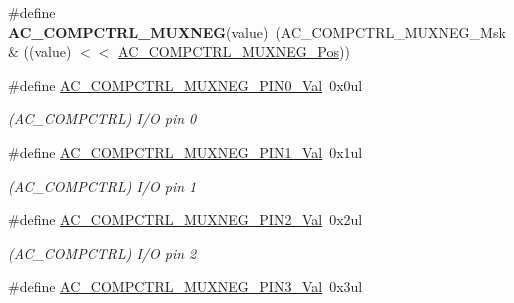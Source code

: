 \begin{DoxyCompactItemize}
\item 
\hypertarget{group___s_a_m_l21___a_c_ga8c5e16bd05f77c149de2f6ffe118ffa9}{}\#define {\bfseries A\+C\+\_\+\+C\+O\+M\+P\+C\+T\+R\+L\+\_\+\+M\+U\+X\+N\+E\+G}(value)~(A\+C\+\_\+\+C\+O\+M\+P\+C\+T\+R\+L\+\_\+\+M\+U\+X\+N\+E\+G\+\_\+\+Msk \& ((value) $<$$<$ \hyperlink{group___s_a_m_l21___a_c_gae66ccdb1fdce71c5b35d4acf2dcd5234}{A\+C\+\_\+\+C\+O\+M\+P\+C\+T\+R\+L\+\_\+\+M\+U\+X\+N\+E\+G\+\_\+\+Pos}))\label{group___s_a_m_l21___a_c_ga8c5e16bd05f77c149de2f6ffe118ffa9}

\item 
\hypertarget{group___s_a_m_l21___a_c_ga6ac9acc365e62893a521696477b34269}{}\#define \hyperlink{group___s_a_m_l21___a_c_ga6ac9acc365e62893a521696477b34269}{A\+C\+\_\+\+C\+O\+M\+P\+C\+T\+R\+L\+\_\+\+M\+U\+X\+N\+E\+G\+\_\+\+P\+I\+N0\+\_\+\+Val}~0x0ul\label{group___s_a_m_l21___a_c_ga6ac9acc365e62893a521696477b34269}

\begin{DoxyCompactList}\small\item\em (A\+C\+\_\+\+C\+O\+M\+P\+C\+T\+R\+L) I/\+O pin 0 \end{DoxyCompactList}\item 
\hypertarget{group___s_a_m_l21___a_c_ga873c2d1c95b263a318071d6689addd68}{}\#define \hyperlink{group___s_a_m_l21___a_c_ga873c2d1c95b263a318071d6689addd68}{A\+C\+\_\+\+C\+O\+M\+P\+C\+T\+R\+L\+\_\+\+M\+U\+X\+N\+E\+G\+\_\+\+P\+I\+N1\+\_\+\+Val}~0x1ul\label{group___s_a_m_l21___a_c_ga873c2d1c95b263a318071d6689addd68}

\begin{DoxyCompactList}\small\item\em (A\+C\+\_\+\+C\+O\+M\+P\+C\+T\+R\+L) I/\+O pin 1 \end{DoxyCompactList}\item 
\hypertarget{group___s_a_m_l21___a_c_gaaf2bd6174b14f8ca4bdd9f20ec55e017}{}\#define \hyperlink{group___s_a_m_l21___a_c_gaaf2bd6174b14f8ca4bdd9f20ec55e017}{A\+C\+\_\+\+C\+O\+M\+P\+C\+T\+R\+L\+\_\+\+M\+U\+X\+N\+E\+G\+\_\+\+P\+I\+N2\+\_\+\+Val}~0x2ul\label{group___s_a_m_l21___a_c_gaaf2bd6174b14f8ca4bdd9f20ec55e017}

\begin{DoxyCompactList}\small\item\em (A\+C\+\_\+\+C\+O\+M\+P\+C\+T\+R\+L) I/\+O pin 2 \end{DoxyCompactList}\item 
\hypertarget{group___s_a_m_l21___a_c_gac9fa005049fffc6404e5517a25ace420}{}\#define \hyperlink{group___s_a_m_l21___a_c_gac9fa005049fffc6404e5517a25ace420}{A\+C\+\_\+\+C\+O\+M\+P\+C\+T\+R\+L\+\_\+\+M\+U\+X\+N\+E\+G\+\_\+\+P\+I\+N3\+\_\+\+Val}~0x3ul\label{group___s_a_m_l21___a_c_gac9fa005049fffc6404e5517a25ace420}


\end{DoxyCompactItemize}
